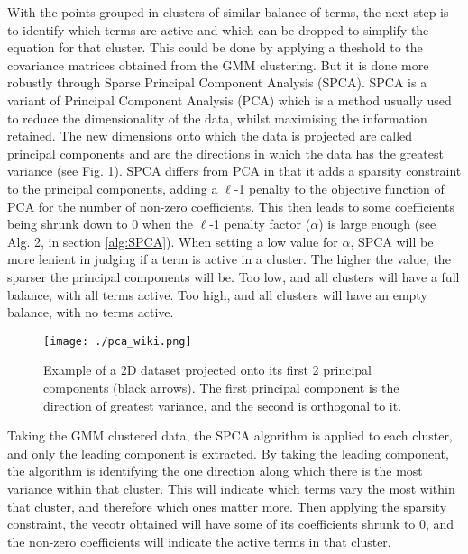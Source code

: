 \documentclass[12pt]{report} %
\begin{document}
With the points grouped in clusters of similar balance of terms, the next step is to identify which terms are active and which can be dropped to simplify the equation for that cluster. This could be done by applying a theshold to the covariance matrices obtained from the GMM clustering. But it is done more robustly through Sparse Principal Component Analysis (SPCA). SPCA is a variant of Principal Component Analysis (PCA) which is a method usually used to reduce the dimensionality of the data, whilst maximising the information retained. The new dimensions onto which the data is projected are called principal components and are the directions in which the data has the greatest variance\cite{lever2017principal} (see Fig. \ref{fig:PCA_wiki}). SPCA differs from PCA in that it adds a sparsity constraint to the principal components, adding a $\ell$-1 penalty to the objective function of PCA for the number of non-zero coefficients. This then leads to some coefficients being shrunk down to 0 when the $\ell$-1 penalty factor ($\alpha$) is large enough\cite{zou2006sparse} (see Alg. 2, in section \ref{alg:SPCA}). When setting a low value for $\alpha$, SPCA will be more lenient in judging if a term is active in a cluster. The higher the value, the sparser the principal components will be. Too low, and all clusters will have a full balance, with all terms active. Too high, and all clusters will have an empty balance, with no terms active.

\begin{figure}[htbp]
  \centering
  \texttt{[image: ./pca\_wiki.png]}
  \caption{Example of a 2D dataset projected onto its first 2 principal components (black arrows). The first principal component is the direction of greatest variance, and the second is orthogonal to it. \cite{pca_wikipedia}}
  \label{fig:PCA_wiki}
\end{figure}

Taking the GMM clustered data, the SPCA algorithm is applied to each cluster, and only the leading component is extracted. By taking the leading component, the algorithm is identifying the one direction along which there is the most variance within that cluster. This will indicate which terms vary the most within that cluster, and therefore which ones matter more. Then applying the sparsity constraint, the vecotr obtained will have some of its coefficients shrunk to 0, and the non-zero coefficients will indicate the active terms in that cluster.

\vspace{5mm}
\end{document}

